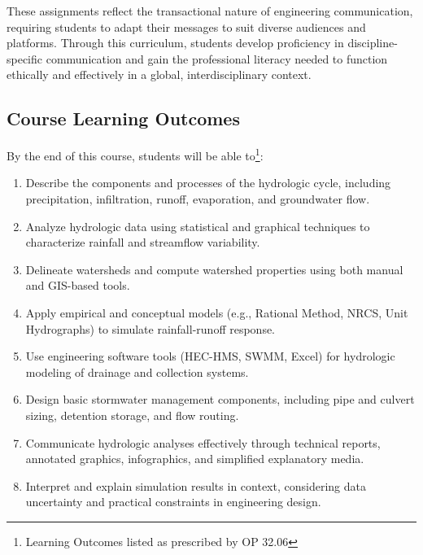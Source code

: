\documentclass[12pt]{article}
\begin{document}
These assignments reflect the transactional nature of engineering communication, requiring students to adapt their messages to suit diverse audiences and platforms. Through this curriculum, students develop proficiency in discipline-specific communication and gain the professional literacy needed to function ethically and effectively in a global, interdisciplinary context.
\subsection*{Course Learning Outcomes}

By the end of this course, students will be able to\footnote{Learning Outcomes listed as prescribed by OP 32.06}:

\begin{enumerate}
    \item Describe the components and processes of the hydrologic cycle, including precipitation, infiltration, runoff, evaporation, and groundwater flow.
    \item Analyze hydrologic data using statistical and graphical techniques to characterize rainfall and streamflow variability.
    \item Delineate watersheds and compute watershed properties using both manual and GIS-based tools.
    \item Apply empirical and conceptual models (e.g., Rational Method, NRCS, Unit Hydrographs) to simulate rainfall-runoff response.
    \item Use engineering software tools (HEC-HMS, SWMM, Excel) for hydrologic modeling of drainage and collection systems.
    \item Design basic stormwater management components, including pipe and culvert sizing, detention storage, and flow routing.
    \item Communicate hydrologic analyses effectively through technical reports, annotated graphics, infographics, and simplified explanatory media.
    \item Interpret and explain simulation results in context, considering data uncertainty and practical constraints in engineering design.
\end{enumerate}

\end{document}
